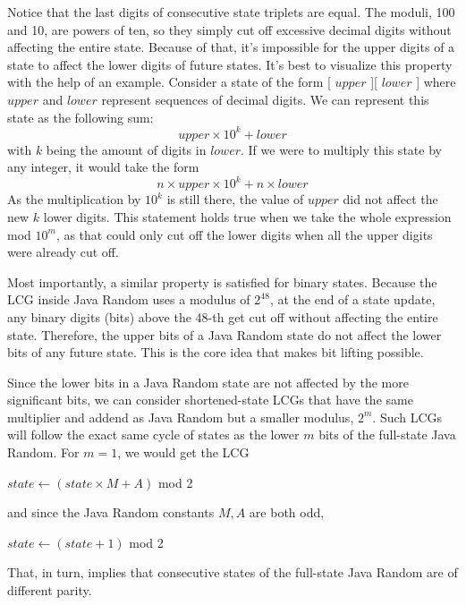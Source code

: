\documentclass{article}
\begin{document}
Notice that the last digits of consecutive state triplets are equal. The moduli, 100 and 10, are powers of ten, so they simply cut off excessive decimal digits without affecting the entire state. Because of that, it’s impossible for the upper digits of a state to affect the lower digits of future states. It’s best to visualize this property with the help of an example. Consider a state of the form [ $upper$ ][ $lower$ ] where $upper$ and $lower$ represent sequences of decimal digits. We can represent this state as the following sum:
\begin{equation}
    upper \times 10^k + lower
\end{equation}
\noindent with $k$ being the amount of digits in $lower$. If we were to multiply this state by any integer, it would take the form
\begin{equation}
    n \times upper \times 10^k + n \times lower
\end{equation}
\noindent As the multiplication by $10^k$ is still there, the value of $upper$ did not affect the new $k$ lower digits. This statement holds true when we take the whole expression mod $10^m$, as that could only cut off the lower digits when all the upper digits were already cut off.

Most importantly, a similar property is satisfied for binary states. Because the LCG inside Java Random uses a modulus of $2^{48}$, at the end of a state update, any binary digits (bits) above the 48-th get cut off without affecting the entire state. Therefore, the upper bits of a Java Random state do not affect the lower bits of any future state. This is the core idea that makes bit lifting possible.

Since the lower bits in a Java Random state are not affected by the more significant bits, we can consider shortened-state LCGs that have the same multiplier and addend as Java Random but a smaller modulus, $2^m$. Such LCGs will follow the exact same cycle of states as the lower $m$ bits of the full-state Java Random. For $m = 1$, we would get the LCG
\begin{algorithmic}
    \State $state \gets (state \times M + A)$ mod 2
\end{algorithmic}
\noindent and since the Java Random constants $M, A$ are both odd,
\begin{algorithmic}
    \State $state \gets (state + 1)$ mod 2
\end{algorithmic}
\noindent That, in turn, implies that consecutive states of the full-state Java Random are of different parity.
\end{document}
